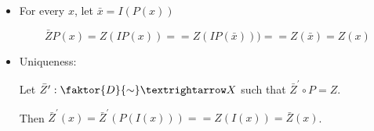 \documentclass{article}
\begin{document}
\begin{enumerate}
\begin{itemize}
\begin{itemize}
              \begin{itemize}
                \item
                    For every $x$, let $\bar{x} = I(P(x))$
                    
                    \begin{equation*}
                    \bar{Z} P(x) = Z (I P(x)) =          %
                                 = Z (I P(\bar{x}) )) =  %
                                 = Z (\bar{x})           %
                                 = Z (x)                 %
                    \end{equation*}  
                    
                \item
                    Uniqueness:
                    
                    Let $\bar{Z}^\prime : \faktor{D}{\sim} → X$ such
                    that $\bar{Z}^\prime \circ P = Z$.

                    
                    Then $\bar{Z}^\prime(x) = \bar{Z}^\prime(P(I(x))) =
                                          = Z(I(x)) = \bar{Z}(x)$.
             \end{itemize}
        \end{itemize}
    \end{itemize}    
\end{enumerate}
\end{document}
